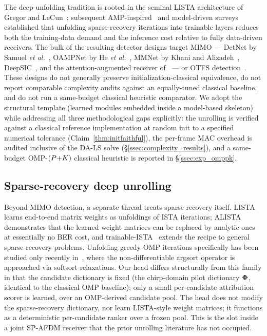 The deep-unfolding tradition is rooted in the seminal LISTA architecture
of Gregor and LeCun~\cite{gregor2010lista}; subsequent
AMP-inspired~\cite{borgerding2017amp} and model-driven
surveys~\cite{he2019modeldrivensurvey,monga2021unrolling,balatsoukasstimming2019deepunfolding,shlezinger2022modelbasedsurvey}
established that unfolding sparse-recovery iterations into trainable
layers reduces both the training-data demand and the inference cost
relative to fully data-driven receivers. The bulk of the resulting
detector designs target MIMO --- DetNet by Samuel \emph{et
al.}~\cite{samuel2019detnet}, OAMPNet by He \emph{et al.}~\cite{he2020modeldrivenmimo},
MMNet by Khani and Alizadeh~\cite{khani2020mmnet},
DeepSIC~\cite{shlezinger2021deepsic}, and the attention-augmented
receiver of~\cite{xu2024detecttolearn} ---
or OTFS detection~\cite{yuan2022uampotfs,pu2024epotfs,zhuang2024amgnnotfs}.
These designs do not generally preserve initialization-classical
equivalence, do not report comparable complexity audits against an
equally-tuned classical baseline, and do not run a same-budget classical
heuristic comparator. We adopt the structural template (learned modules
embedded inside a model-based skeleton) while addressing all three
methodological gaps explicitly: the unrolling is verified against a
classical reference implementation at random init to a specified numerical
tolerance (Claim~\ref{thm:initfaithful}), the per-frame MAC overhead is
audited inclusive of the DA-LS solve (\S\ref{ssec:complexity_results}),
and a same-budget OMP-$(P{+}K)$ classical heuristic is reported in
\S\ref{ssec:exp_omppk}.

\subsection{Sparse-recovery deep unrolling}
\label{ssec:related_sparse}

Beyond MIMO detection, a separate thread treats sparse recovery itself.
LISTA~\cite{gregor2010lista} learns end-to-end matrix weights as
unfoldings of ISTA iterations;
ALISTA~\cite{liu2019alista,chen2018theoreticallinearconv} demonstrates
that the learned weight matrices can be replaced by analytic ones at
essentially no BER cost, and trainable-ISTA~\cite{takabe2019trainableistarobust}
extends the recipe to general sparse-recovery problems.
Unfolding greedy-OMP iterations specifically has been studied only
recently in~\cite{mohammadtaheri2025deepgreedyunfolding},
where the non-differentiable argsort operator is approached via softsort
relaxations. Our head differs structurally from this family in that the
candidate dictionary is fixed (the chirp-domain pilot dictionary
$\boldsymbol{\Phi}$, identical to the classical OMP baseline); only a small
per-candidate attribution scorer is learned, over an OMP-derived
candidate pool. The head does not modify the sparse-recovery dictionary,
nor learn LISTA-style weight matrices; it functions as a deterministic
per-candidate ranker over a frozen pool. This is the slot inside a joint
SP-AFDM receiver that the prior unrolling literature has not occupied.

